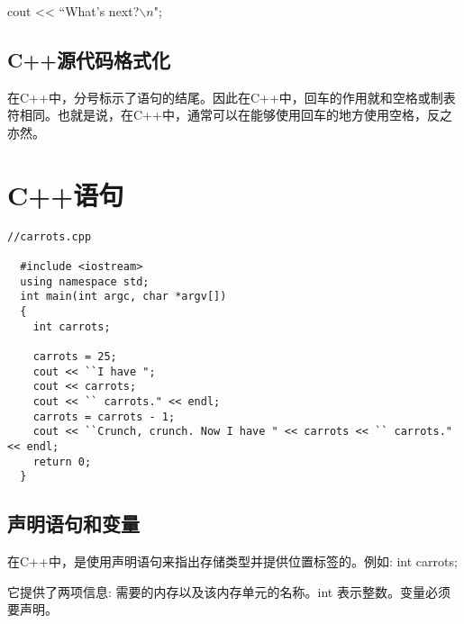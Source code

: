 \documentclass[10pt,a4paper,fleqn]{ctexart}
\begin{document}
cout << ``What's next?$\backslash n$";

\subsection{C++源代码格式化}
在C++中，分号标示了语句的结尾。因此在C++中，回车的作用就和空格或制表符相同。也就是说，在C++中，通常可以在能够使用回车的地方使用空格，反之亦然。

\section{C++语句}
\begin{verbatim}
//carrots.cpp

  #include <iostream>
  using namespace std;
  int main(int argc, char *argv[])
  {
    int carrots;

    carrots = 25;
    cout << ``I have ";
    cout << carrots;
    cout << `` carrots." << endl;
    carrots = carrots - 1;
    cout << ``Crunch, crunch. Now I have " << carrots << `` carrots." << endl;
    return 0;
  }
\end{verbatim}

\subsection{声明语句和变量}
在C++中，是使用声明语句来指出存储类型并提供位置标签的。例如:
int carrots;

它提供了两项信息: 需要的内存以及该内存单元的名称。int 表示整数。变量必须要声明。
\end{document}
